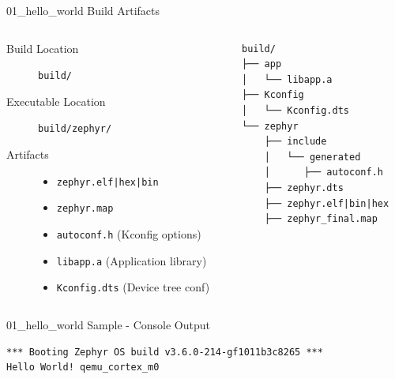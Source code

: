 \documentclass[10pt, aspectratio=169]{beamer}
\begin{document}
\begin{frame}[fragile]{01\_hello\_world Build Artifacts}
  \begin{columns}
    \begin{column}{0.6\textwidth}
      \begin{description}
        \item [Build Location] \texttt{build/}
        \item [Executable Location] \texttt{build/zephyr/}
        \item [Artifacts]
          \begin{itemize}
            \item \texttt{zephyr.elf|hex|bin}
            \item \texttt{zephyr.map}
            \item \texttt{autoconf.h} (Kconfig options)
            \item \texttt{libapp.a} (Application library)
            \item \texttt{Kconfig.dts} (Device tree conf)
          \end{itemize}
      \end{description}
    \end{column}
    \begin{column}{0.4\textwidth}
        {\fontsize{7}{7}\selectfont
          \begin{verbatim}
build/
├── app
│   └── libapp.a
├── Kconfig
│   └── Kconfig.dts
└── zephyr
    ├── include
    │   └── generated
    │      ├── autoconf.h
    ├── zephyr.dts
    ├── zephyr.elf|bin|hex
    ├── zephyr_final.map
          \end{verbatim}
        }
    \end{column}
  \end{columns}
\end{frame}
\begin{frame}[fragile]{01\_hello\_world Sample - Console Output}
  \begin{listing}[H]
    \begin{verbatim}
*** Booting Zephyr OS build v3.6.0-214-gf1011b3c8265 ***
Hello World! qemu_cortex_m0
    \end{verbatim}
  \caption{\scriptsize{Console Output}}
  \end{listing}
\end{frame}
\end{document}
